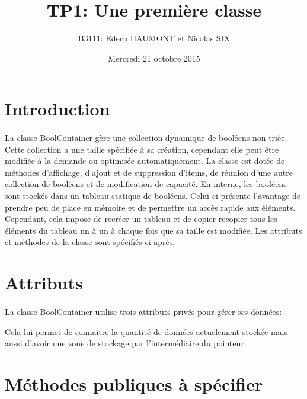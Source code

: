 \documentclass[a4paper, 12pts]{article}
\title{TP1: Une première classe}
\author{B3111: Edern HAUMONT et Nicolas SIX}
\date{Mercredi 21 octobre 2015}
\begin{document}

\maketitle






\section{Introduction}
\paragraph{}
La classe BoolContainer gère une collection dynamique de booléens non triée. Cette collection a une taille spécifiée à sa création, cependant elle peut être modifiée à la demande ou optimisée automatiquement.
La classe est dotée de méthodes d’affichage, d’ajout et de suppression d’items, de réunion d’une autre collection de booléens et de modification de capacité.
En interne, les booléens sont stockés dans un tableau statique de booléens. Celui-ci présente l'avantage de prendre peu de place en mémoire et de permettre un accès rapide aux éléments. Cependant, cela impose de recréer un tableau et de copier recopier tous les éléments du tableau un à un à chaque fois que sa taille est modifiée.
Les attributs et méthodes de la classe sont spécifiés ci-après.

\section{Attributs}
\paragraph{}
La classe BoolContainer utilise trois attributs privés pour gérer ses données:

Cela lui permet de connaitre la quantité de données actuelement stockée mais aussi d'avoir une zone de stockage par l'intermédiaire du pointeur.

\section{Méthodes publiques à spécifier}
\end{document}
